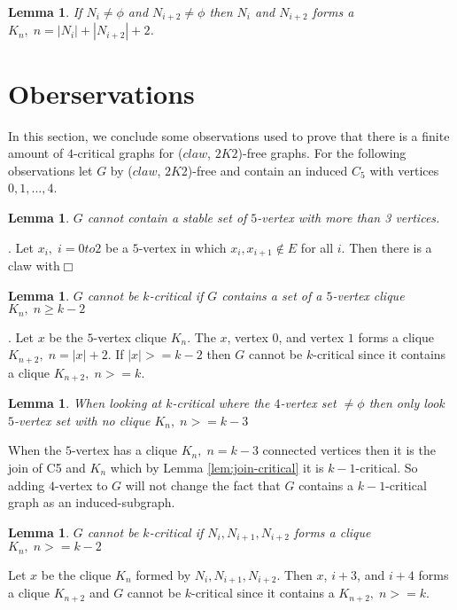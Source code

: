 \documentclass[12pt]{article}
\newtheorem{Lemma}[Theorem]{Lemma}
\def\CK{($claw$, $2K2$)}
\begin{document}
\begin{Lemma}\label{lem:c5-neighbours}
If $N_i \neq \phi$ and $N_{i+2} \neq \phi$ then $N_i$ and $N_{i+2}$ forms a $K_n,\; n = |N_i| + |N_{i+2}| +2 $. 
\end{Lemma}

\section{Oberservations}\label{sec:observations}
In this section, we conclude some observations used to prove that there is a finite amount of $4$-critical graphs for {\CK}-free graphs. For the following observations let $G$ by {\CK}-free and contain an induced $C_5$ with vertices $0, 1, ..., 4$.
\begin{Lemma}\label{lem:3i-5v}
$G$ cannot contain a stable set of  $5$-vertex with more than 3 vertices.
\end{Lemma}
. Let $x_i ,\; i=0to2$ be a $5$-vertex in which $x_i,x_{i+1} \not\in E$ for all $i$. Then there is a claw with$\Box$

\begin{Lemma}\label{lem:connected-5v}
$G$ cannot be $k$-critical if $G$ contains a set of a $5$-vertex clique $K_n,\; n \geq k - 2$
\end{Lemma}
. Let $x$ be the $5$-vertex clique $K_n$. The $x$, vertex $0$, and vertex $1$ forms a clique $K_{n+2},\; n = |x| + 2$. If $|x| > =k - 2$ then $G$ cannot be $k$-critical since it contains a clique $K_{n+2},\; n >= k$.

\begin{Lemma}\label{lem:4set-with-5set}
When looking at $k$-critical where the $4$-vertex set $ \neq \phi$ then only look $5$-vertex set with no clique $K_n,\; n >= k - 3$
\end{Lemma}
 When the $5$-vertex has a clique $K_n,\; n = k - 3$ connected vertices then it is the join of C5 and $K_n$ which by Lemma \ref{lem:join-critical} it is $k-1$-critical. So adding $4$-vertex to $G$ will not change the fact that $G$ contains a $k - 1$-critical graph as an induced-subgraph.

\begin{Lemma}\label{lem:4v-kn}
$G$ cannot be $k$-critical if $N_i, N_{i+1}, N_{i+2}$ forms a clique $K_n,\; n >= k - 2$
\end{Lemma}
 Let  $x$ be the clique $K_n$ formed by $N_i, N_{i+1}, N_{i+2}$. Then $x$, $i+3$, and $i+4$ forms a clique $K_{n+2}$ and $G$ cannot be $k$-critical since it contains a $K_{n+2},\; n >= k$.
\end{document}
